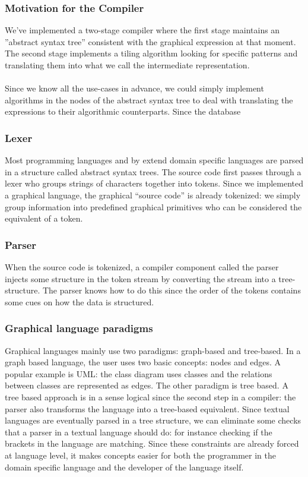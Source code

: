 \subsubsection{Motivation for the Compiler}
We've implemented a two-stage compiler where the first stage maintains an
''abstract syntax tree'' consistent with the graphical expression at that
moment. The second stage implements a tiling algorithm looking for specific
patterns and translating them into what we call the intermediate representation.
\paragraph{}
Since we know all the use-cases in advance, we could simply implement
algorithms in the nodes of the abstract syntax tree to deal with translating
the expressions to their algorithmic counterparts. Since the database
\subsubsection{Lexer}
Most programming languages and by extend domain specific languages are parsed
in a structure called abstract syntax trees. The source code first passes
through a lexer who groups strings of characters together into tokens. Since we
implemented a graphical language, the graphical ``source code'' is already
tokenized: we simply group information into predefined graphical primitives who
can be considered the equivalent of a token.
\subsubsection{Parser}
When the source code is tokenized, a compiler component called the parser
injects some structure in the token stream by converting the stream into a
tree-structure. The parser knows how to do this since the order of the tokens
contains some cues on how the data is structured.
\subsubsection{Graphical language paradigms}
Graphical languages mainly use two paradigms: graph-based and tree-based. In a
graph based language, the user uses two basic concepts: nodes and edges. A
popular example is UML: the class diagram uses classes and the relations
between classes are represented as edges. The other paradigm is tree based. A
tree based approach is in a sense logical since the second step in a compiler:
the parser also transforms the language into a tree-based equivalent. Since
textual languages are eventually parsed in a tree structure, we can eliminate
some checks that a parser in a textual language should do: for instance
checking if the brackets in the language are matching. Since these constraints
are already forced at language level, it makes concepts easier for both the
programmer in the domain specific language and the developer of the language
itself.
